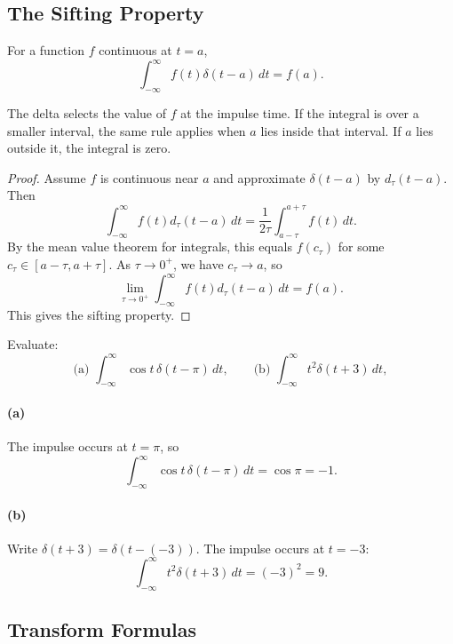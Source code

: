 \documentclass[10pt,letterpaper]{article}
\begin{document}
\subsection{The Sifting Property}

\begin{theorem}
For a function $f$ continuous at $t=a$,
\[
\boxed{
\int_{-\infty}^{\infty}f(t)\delta(t-a)\,dt=f(a).
}
\]
\end{theorem}

The delta selects the value of $f$ at the impulse time.
If the integral is over a smaller interval, the same
rule applies when $a$ lies inside that interval.
If $a$ lies outside it, the integral is zero.

\begin{proof}
Assume $f$ is continuous near $a$ and approximate
$\delta(t-a)$ by $d_\tau(t-a)$. Then
\[
\int_{-\infty}^{\infty}f(t)d_\tau(t-a)\,dt
=\frac{1}{2\tau}\int_{a-\tau}^{a+\tau}f(t)\,dt.
\]
By the mean value theorem for integrals, this equals
$f(c_\tau)$ for some $c_\tau\in[a-\tau,a+\tau]$.
As $\tau\to0^+$, we have $c_\tau\to a$, so
\[
\lim_{\tau\to0^+}
\int_{-\infty}^{\infty}f(t)d_\tau(t-a)\,dt=f(a).
\]
This gives the sifting property.
\end{proof}

\begin{example}[1]{
Evaluate:
\[
\text{(a) }\int_{-\infty}^{\infty}
\cos t\,\delta(t-\pi)\,dt,
\qquad
\text{(b) }\int_{-\infty}^{\infty}
t^2\delta(t+3)\,dt,
\]
}

\paragraph{(a)}
The impulse occurs at $t=\pi$, so
\[
\int_{-\infty}^{\infty}\cos t\,\delta(t-\pi)\,dt
=\cos\pi=\boxed{-1}.
\]

\paragraph{(b)}
Write $\delta(t+3)=\delta(t-(-3))$.
The impulse occurs at $t=-3$:
\[
\int_{-\infty}^{\infty}t^2\delta(t+3)\,dt
=(-3)^2=\boxed{9}.
\]
\end{example}

\subsection{Transform Formulas}
\end{document}
